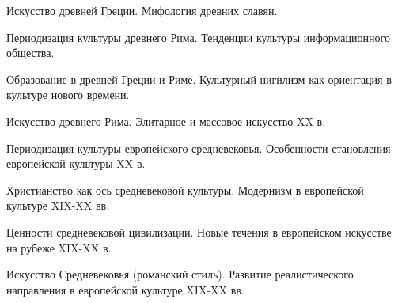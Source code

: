 \documentclass[
	14pt,
	a4paper,
	]
	{scrartcl}
\begin{document}
\shapk
{}
\setcounter{zad}{0}

\vfill
\z Искусство древней Греции.
 \vfill
\z Мифология древних славян.
 \vfill

\vfill

\newpage


\shapk
{}
\setcounter{zad}{0}

\vfill
\z Периодизация культуры древнего Рима.
 \vfill
\z Тенденции культуры информационного общества.
 \vfill

\vfill

\newpage


\shapk
{}
\setcounter{zad}{0}

\vfill
\z Образование в древней Греции и Риме.
 \vfill
\z Культурный нигилизм как ориентация в культуре нового времени.
 \vfill

\vfill

\newpage


\shapk
{}
\setcounter{zad}{0}

\vfill
\z Искусство древнего Рима.
 \vfill
\z Элитарное и массовое искусство XX в.
 \vfill

\vfill

\newpage


\shapk
{}
\setcounter{zad}{0}

\vfill
\z Периодизация культуры европейского средневековья.
 \vfill
\z Особенности становления европейской культуры XX в.
 \vfill

\vfill

\newpage


\shapk
{}
\setcounter{zad}{0}

\vfill
\z Христианство как ось средневековой культуры.
 \vfill
\z Модернизм в европейской культуре XIX-XX вв.
 \vfill

\vfill

\newpage


\shapk
{}
\setcounter{zad}{0}

\vfill
\z Ценности средневековой цивилизации.
 \vfill
\z Новые течения в европейском искусстве на рубеже XIX-XX в.
 \vfill

\vfill

\newpage


\shapk
{}
\setcounter{zad}{0}

\vfill
\z Искусство Средневековья (романский стиль).
 \vfill
\z Развитие реалистического направления в европейской культуре XIX-XX вв.
 \vfill
\end{document}
